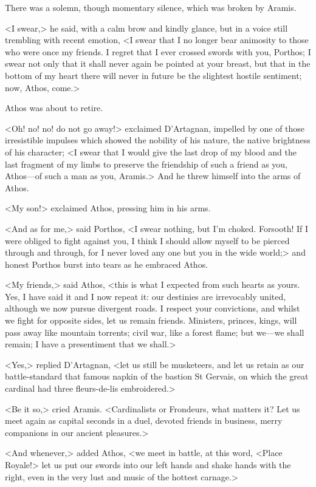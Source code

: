 There was a solemn, though momentary silence, which was broken by Aramis.

<I swear,> he said, with a calm brow and kindly glance, but in a voice still trembling with recent emotion, <I swear that I no longer bear animosity to those who were once my friends. I regret that I ever crossed swords with you, Porthos; I swear not only that it shall never again be pointed at your breast, but that in the bottom of my heart there will never in future be the slightest hostile sentiment; now, Athos, come.>

Athos was about to retire.

<Oh! no! no! do not go away!> exclaimed D'Artagnan, impelled by one of those irresistible impulses which showed the nobility of his nature, the native brightness of his character; <I swear that I would give the last drop of my blood and the last fragment of my limbs to preserve the friendship of such a friend as you, Athos—of such a man as you, Aramis.> And he threw himself into the arms of Athos.

<My son!> exclaimed Athos, pressing him in his arms.

<And as for me,> said Porthos, <I swear nothing, but I'm choked. Forsooth! If I were obliged to fight against you, I think I should allow myself to be pierced through and through, for I never loved any one but you in the wide world;> and honest Porthos burst into tears as he embraced Athos.

<My friends,> said Athos, <this is what I expected from such hearts as yours. Yes, I have said it and I now repeat it: our destinies are irrevocably united, although we now pursue divergent roads. I respect your convictions, and whilst we fight for opposite sides, let us remain friends. Ministers, princes, kings, will pass away like mountain torrents; civil war, like a forest flame; but we—we shall remain; I have a presentiment that we shall.>

<Yes,> replied D'Artagnan, <let us still be musketeers, and let us retain as our battle-standard that famous napkin of the bastion St Gervais, on which the great cardinal had three fleurs-de-lis embroidered.>

<Be it so,> cried Aramis. <Cardinalists or Frondeurs, what matters it? Let us meet again as capital seconds in a duel, devoted friends in business, merry companions in our ancient pleasures.>

<And whenever,> added Athos, <we meet in battle, at this word, <Place Royale!> let us put our swords into our left hands and shake hands with the right, even in the very lust and music of the hottest carnage.>

